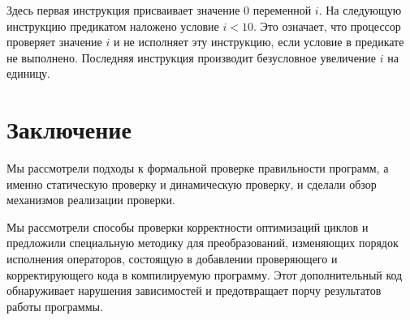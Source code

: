 Здесь первая инструкция присваивает значение $0$ переменной $i$. На следующую инструкцию предикатом наложено условие $i < 10$. Это означает, что процессор проверяет значение $i$ и не исполняет эту инструкцию, если условие в предикате не выполнено. Последняя инструкция производит безусловное увеличение $i$ на единицу.

\section*{Заключение}
%

Мы рассмотрели подходы к формальной проверке правильности программ, а именно статическую проверку и динамическую проверку, и сделали обзор механизмов реализации проверки.

Мы рассмотрели способы проверки корректности оптимизаций циклов и предложили специальную методику для преобразований, изменяющих порядок исполнения операторов, состоящую в добавлении проверяющего и корректирующего кода в компилируемую программу. Этот дополнительный код обнаруживает нарушения зависимостей и предотвращает порчу результатов работы программы.